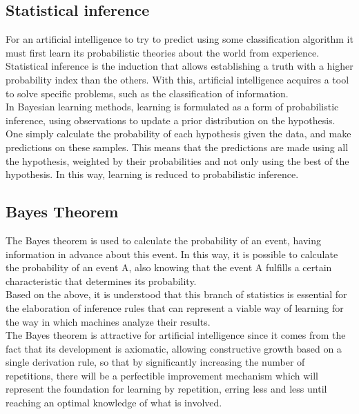 \documentclass[sigconf,12pt,review=false,natbib=false]{acmart}
\begin{document}
\subsection{Statistical inference}

For an artificial intelligence to try to predict using some classification algorithm it must first learn its
probabilistic theories about the world from experience. 
Statistical inference is the induction that allows establishing a truth with a higher probability index than
the others. With this, artificial intelligence acquires a tool to solve specific problems, such as the classification
of information. \\

In Bayesian learning methods, learning is formulated as a form of probabilistic inference, using observations to
update a prior distribution on the hypothesis. \\

One simply calculate the probability of each hypothesis given the data, and make predictions on these samples.
This means that the predictions are made using all the hypothesis, weighted by their probabilities and not only
using the best of the hypothesis. In this way, learning is reduced to probabilistic inference. \\

\subsection{Bayes Theorem}

The Bayes theorem is used to calculate the probability of an event, having information in advance
about this event. In this way, it is possible to calculate the probability of an event A, also
knowing that the event A fulfills a certain characteristic that determines its probability. \\

Based on the above, it is understood that this branch of statistics is essential for the elaboration
of inference rules that can represent a viable way of learning for the way in which machines analyze
their results. \\

The Bayes theorem is attractive for artificial intelligence since it comes from the fact that its
development is axiomatic, allowing constructive growth based on a single derivation rule, so that by
significantly increasing the number of repetitions, there will be a perfectible improvement mechanism
which will represent the foundation for learning by repetition, erring less and less until reaching
an optimal knowledge of what is involved. \\
\end{document}
